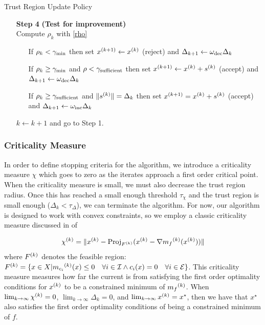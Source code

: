 \begin{algorithm}[H]
    \caption{Trust Region Update Policy}
    \label{trust_region_update}
    \begin{itemize}
        \item[\textbf{Step 4}] \textbf{(Test for improvement)} \\
            Compute $\rho_k$ with \cref{rho} \begin{itemize}
                \item[] If $\rho_k < \gamma_{\text{min}}$ then set ${x}^{(k+1)} \gets {x}^{(k)}$ (reject) and $\Delta_{k+1} \gets \omega_{\text{dec}}\Delta_{k}$
                \item[] If $\rho_k \ge \gamma_{\text{min}}$ and $\rho < \gamma_{\text{sufficient}}$ then set ${x}^{(k+1)}\gets{x}^{(k)}+{s}^{(k)}$ (accept) and $\Delta_{k+1} \gets \omega_{\text{dec}}\Delta_{k}$
                \item[] If $\rho_k \ge \gamma_{\text{sufficient}}$ and $\|{s}^{(k)}\| = \Delta_{k}$ then set ${x}^{(k+1)}={x}^{(k)}+{s}^{(k)}$ (accept) and $\Delta_{k+1} \gets \omega_{\text{inc}}\Delta_{k}$
            \end{itemize}
            $k \gets k+1$ and go to Step 1.
    \end{itemize}
\end{algorithm}




\subsubsection{Criticality Measure}

In order to define stopping criteria for the algorithm, we introduce a criticality measure $\chi$ which goes to zero as the iterates approach a first order critical point.
When the criticality measure is small, we must also decrease the trust region radius.
Once this has reached a small enough threshold $\tau_{\chi}$ and the trust region is small enough ($\Delta_k < \tau_{\Delta}$), we can terminate the algorithm.
For now, our algorithm is designed to work with convex constraints, so we employ a classic criticality measure discussed in \cite{ConnGoulToin00} of

\[
{\chi^{(k)}} = \|{x}^{(k)} - \text{Proj}_{{F}^{(k)}}({x}^{(k)}- \nabla {{m}_f}^{(k)}({x}^{(k)}))\|
\]
where ${F}^{(k)}$ denotes the feasible region: ${F}^{(k)} = \{x \in X | {{m}_{c_i}}^{(k)}(x) \le 0 \quad \forall i \in \mathcal I \wedge c_i(x) = 0 \quad \forall i \in \mathcal E \}$.
This criticality measure measures how far the current is from satisfying the first order optimality conditions for ${x}^{(k)}$ to be a constrained minimum of ${{m}_f}^{(k)}$.
When $ \lim_{k\to\infty} {\chi^{(k)}} = 0$, $\lim_{k\to\infty}\Delta_k = 0$, and $\lim_{k\to\infty}{x}^{(k)} = x^{\star}$, then we have that $x^{\star}$ also satisfies the first order optimality conditions of being a constrained minimum of $f$.

